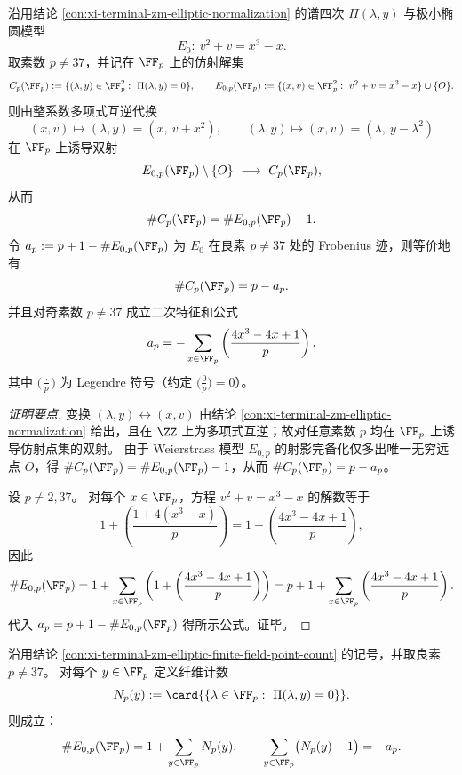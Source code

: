 \begin{conclusion}\label{con:xi-terminal-zm-elliptic-finite-field-point-count}
沿用结论 \ref{con:xi-terminal-zm-elliptic-normalization} 的谱四次 \(\Pi(\lambda,y)\) 与极小椭圆模型
\[
E_0:\ v^{2}+v=x^{3}-x.
\]
取素数 \(p\neq 37\)，并记在 \(\FF_p\) 上的仿射解集
\[
C_p(\FF_p):=\{(\lambda,y)\in\FF_p^{2}:\ \Pi(\lambda,y)=0\},
\qquad
E_{0,p}(\FF_p):=\{(x,v)\in\FF_p^{2}:\ v^{2}+v=x^{3}-x\}\cup\{O\}.
\]
则由整系数多项式互逆代换
\[
(x,v)\longmapsto(\lambda,y)=(x,\ v+x^{2}),
\qquad
(\lambda,y)\longmapsto(x,v)=(\lambda,\ y-\lambda^{2})
\]
在 \(\FF_p\) 上诱导双射
\[
E_{0,p}(\FF_p)\setminus\{O\}\ \longrightarrow\ C_p(\FF_p),
\]
从而
\[
\#C_p(\FF_p)=\#E_{0,p}(\FF_p)-1.
\]
令
\(
a_p:=p+1-\#E_{0,p}(\FF_p)
\)
为 \(E_0\) 在良素 \(p\neq 37\) 处的 Frobenius 迹，则等价地有
\[
\#C_p(\FF_p)=p-a_p.
\]
并且对奇素数 \(p\neq 37\) 成立二次特征和公式
\[
a_p=-\sum_{x\in\FF_p}\left(\frac{4x^{3}-4x+1}{p}\right),
\]
其中 \(\bigl(\tfrac{\cdot}{p}\bigr)\) 为 Legendre 符号（约定 \(\bigl(\tfrac{0}{p}\bigr)=0\)）。
\end{conclusion}
\begin{proof}[证明要点]
变换 \((\lambda,y)\leftrightarrow(x,v)\) 由结论 \ref{con:xi-terminal-zm-elliptic-normalization} 给出，且在 \(\ZZ\) 上为多项式互逆；故对任意素数 \(p\) 均在 \(\FF_p\) 上诱导仿射点集的双射。
由于 Weierstrass 模型 \(E_{0,p}\) 的射影完备化仅多出唯一无穷远点 \(O\)，得 \(\#C_p(\FF_p)=\#E_{0,p}(\FF_p)-1\)，从而 \(\#C_p(\FF_p)=p-a_p\)。
\par
设 \(p\neq 2,37\)。
对每个 \(x\in\FF_p\)，方程 \(v^{2}+v=x^{3}-x\) 的解数等于
\[
1+\left(\frac{1+4(x^{3}-x)}{p}\right)=1+\left(\frac{4x^{3}-4x+1}{p}\right),
\]
因此
\[
\#E_{0,p}(\FF_p)
=1+\sum_{x\in\FF_p}\left(1+\left(\frac{4x^{3}-4x+1}{p}\right)\right)
=p+1+\sum_{x\in\FF_p}\left(\frac{4x^{3}-4x+1}{p}\right).
\]
代入 \(a_p=p+1-\#E_{0,p}(\FF_p)\) 得所示公式。证毕。
\end{proof}

\begin{proposition}\label{prop:xi-terminal-zm-elliptic-fiber-count-mean-trace}
沿用结论 \ref{con:xi-terminal-zm-elliptic-finite-field-point-count} 的记号，并取良素 \(p\neq 37\)。
对每个 \(y\in\FF_p\) 定义纤维计数
\[
N_p(y):=\card{\{\lambda\in\FF_p:\ \Pi(\lambda,y)=0\}}.
\]
则成立：
\[
\#E_{0,p}(\FF_p)=1+\sum_{y\in\FF_p}N_p(y),
\qquad
\sum_{y\in\FF_p}\bigl(N_p(y)-1\bigr)=-a_p.
\]
\end{proposition}

